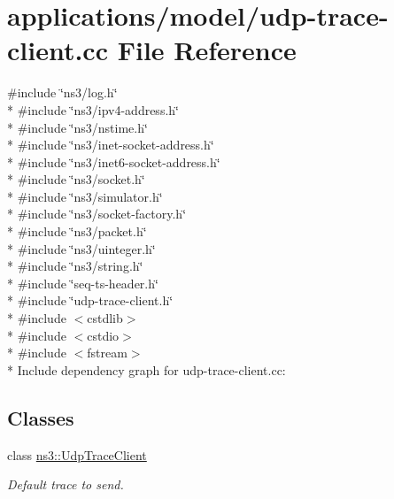 \hypertarget{udp-trace-client_8cc}{}\section{applications/model/udp-\/trace-\/client.cc File Reference}
\label{udp-trace-client_8cc}
{\ttfamily \#include \char`\"{}ns3/log.\+h\char`\"{}}\\*
{\ttfamily \#include \char`\"{}ns3/ipv4-\/address.\+h\char`\"{}}\\*
{\ttfamily \#include \char`\"{}ns3/nstime.\+h\char`\"{}}\\*
{\ttfamily \#include \char`\"{}ns3/inet-\/socket-\/address.\+h\char`\"{}}\\*
{\ttfamily \#include \char`\"{}ns3/inet6-\/socket-\/address.\+h\char`\"{}}\\*
{\ttfamily \#include \char`\"{}ns3/socket.\+h\char`\"{}}\\*
{\ttfamily \#include \char`\"{}ns3/simulator.\+h\char`\"{}}\\*
{\ttfamily \#include \char`\"{}ns3/socket-\/factory.\+h\char`\"{}}\\*
{\ttfamily \#include \char`\"{}ns3/packet.\+h\char`\"{}}\\*
{\ttfamily \#include \char`\"{}ns3/uinteger.\+h\char`\"{}}\\*
{\ttfamily \#include \char`\"{}ns3/string.\+h\char`\"{}}\\*
{\ttfamily \#include \char`\"{}seq-\/ts-\/header.\+h\char`\"{}}\\*
{\ttfamily \#include \char`\"{}udp-\/trace-\/client.\+h\char`\"{}}\\*
{\ttfamily \#include $<$cstdlib$>$}\\*
{\ttfamily \#include $<$cstdio$>$}\\*
{\ttfamily \#include $<$fstream$>$}\\*
Include dependency graph for udp-\/trace-\/client.cc\+:
\subsection*{Classes}
\begin{DoxyCompactItemize}
\item 
class \hyperlink{structns3_1_1UdpTraceClient}{ns3\+::\+Udp\+Trace\+Client}
\begin{DoxyCompactList}\small\item\em Default trace to send. \end{DoxyCompactList}\end{DoxyCompactItemize}
